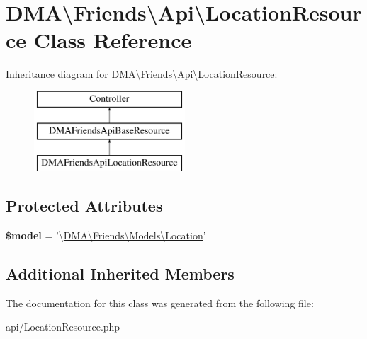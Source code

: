 \hypertarget{classDMA_1_1Friends_1_1Api_1_1LocationResource}{\section{D\-M\-A\textbackslash{}Friends\textbackslash{}Api\textbackslash{}Location\-Resource Class Reference}
\label{classDMA_1_1Friends_1_1Api_1_1LocationResource}
}
Inheritance diagram for D\-M\-A\textbackslash{}Friends\textbackslash{}Api\textbackslash{}Location\-Resource\-:\begin{figure}[H]
\begin{center}
\leavevmode
\includegraphics[height=3.000000cm]{d3/d3e/classDMA_1_1Friends_1_1Api_1_1LocationResource}
\end{center}
\end{figure}
\subsection*{Protected Attributes}
\begin{DoxyCompactItemize}
\item 
\hypertarget{classDMA_1_1Friends_1_1Api_1_1LocationResource_a32a593bbeba6c699743670fda7bae672}{{\bfseries \$model} = '\textbackslash{}\hyperlink{classDMA_1_1Friends_1_1Models_1_1Location}{D\-M\-A\textbackslash{}\-Friends\textbackslash{}\-Models\textbackslash{}\-Location}'}\label{classDMA_1_1Friends_1_1Api_1_1LocationResource_a32a593bbeba6c699743670fda7bae672}

\end{DoxyCompactItemize}
\subsection*{Additional Inherited Members}


The documentation for this class was generated from the following file\-:\begin{DoxyCompactItemize}
\item 
api/Location\-Resource.\-php\end{DoxyCompactItemize}

